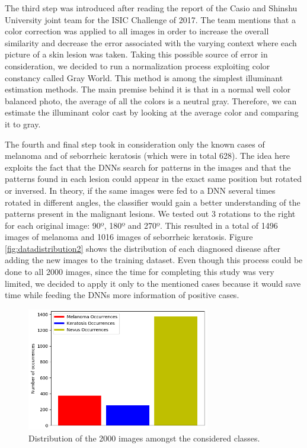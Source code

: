 \documentclass[10pt]{IEEEtran}
\begin{document}
The third step was introduced after reading the report of the Casio and Shinshu University joint team for the ISIC Challenge of 2017.
The team mentions that a color correction was applied to all images in order to increase the overall similarity and decrease the error associated with the varying context where each picture of a skin lesion was taken.
Taking this possible source of error in consideration, we decided to run a normalization process exploiting color constancy called Gray World. 
This method is among the simplest illuminant estimation methods. The main premise behind it is that in a normal well color balanced photo, the average of all the colors is a neutral gray. Therefore, we can estimate the illuminant color cast by looking at the average color and comparing it to gray.

The fourth and final step took in consideration only the known cases of melanoma and of seborrheic keratosis (which were in total 628).
The idea here exploits the fact that the DNNs search for patterns in the images and that the patterns found in each lesion could appear in the exact same position but rotated or inversed.
In theory, if the same images were fed to a DNN several times rotated in different angles, the classifier would gain a better understanding of the patterns present in the malignant lesions.
We tested out 3 rotations to the right for each original image: 90º, 180º and 270º. 
This resulted in a total of 1496 images of melanoma and 1016 images of seborrheic keratosis.
Figure \ref{fig:datadistribution2} shows the distribution of each diagnosed disease after adding the new images to the training dataset.
Even though this process could be done to all 2000 images, since the time for completing this study was very limited, we decided to apply it only to the mentioned cases because it would save time while feeding the DNNs more information of positive cases.
\newpage{}

\begin{figure}[H]
\centering
\includegraphics[width=8cm]{ISIC_DataClassificationDistribution.jpg}
\caption{Distribution of the 2000 images amongst the considered classes.}
\label{fig:datadistribution1}
\end{figure}
\end{document}
